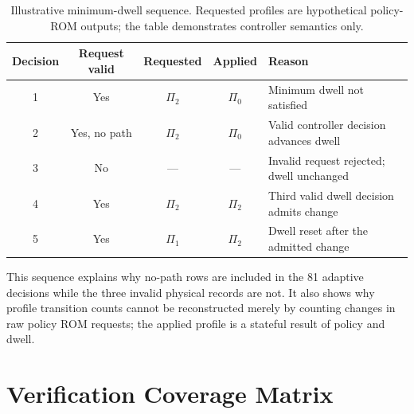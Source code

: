 \begin{table}[H]
\centering
\caption{Illustrative minimum-dwell sequence. Requested profiles are hypothetical
policy-ROM outputs; the table demonstrates controller semantics only.}
\label{tab:worked-dwell-sequence}
\begin{tabularx}{\textwidth}{@{}c c c c X@{}}
\toprule
\textbf{Decision} & \textbf{Request valid} & \textbf{Requested} &
\textbf{Applied} & \textbf{Reason}\\
\midrule
1 & Yes & $\Pi_2$ & $\Pi_0$ & Minimum dwell not satisfied\\
2 & Yes, no path & $\Pi_2$ & $\Pi_0$ & Valid controller decision advances dwell\\
3 & No & --- & --- & Invalid request rejected; dwell unchanged\\
4 & Yes & $\Pi_2$ & $\Pi_2$ & Third valid dwell decision admits change\\
5 & Yes & $\Pi_1$ & $\Pi_2$ & Dwell reset after the admitted change\\
\bottomrule
\end{tabularx}
\end{table}

This sequence explains why no-path rows are included in the 81 adaptive decisions
while the three invalid physical records are not. It also shows why profile
transition counts cannot be reconstructed merely by counting changes in raw policy
ROM requests; the applied profile is a stateful result of policy and dwell.

\section{Verification Coverage Matrix}

